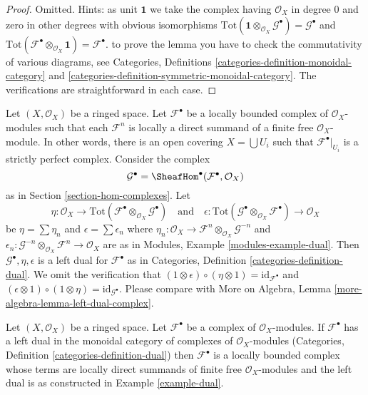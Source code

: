 \begin{proof}
Omitted. Hints: as unit $\mathbf{1}$ we take the complex having
$\mathcal{O}_X$ in degree $0$ and zero in other degrees with
obvious isomorphisms
$\text{Tot}(\mathbf{1} \otimes_{\mathcal{O}_X} \mathcal{G}^\bullet) =
\mathcal{G}^\bullet$ and
$\text{Tot}(\mathcal{F}^\bullet \otimes_{\mathcal{O}_X} \mathbf{1}) =
\mathcal{F}^\bullet$.
to prove the lemma you have to check the commutativity
of various diagrams, see Categories, Definitions
\ref{categories-definition-monoidal-category} and
\ref{categories-definition-symmetric-monoidal-category}.
The verifications are straightforward in each case.
\end{proof}

\begin{example}
\label{example-dual}
Let $(X, \mathcal{O}_X)$ be a ringed space. Let $\mathcal{F}^\bullet$
be a locally bounded complex of $\mathcal{O}_X$-modules such that each
$\mathcal{F}^n$ is locally a direct summand of a finite
free $\mathcal{O}_X$-module. In other words, there is an open covering
$X = \bigcup U_i$ such that $\mathcal{F}^\bullet|_{U_i}$ is a strictly
perfect complex. Consider the complex
$$
\mathcal{G}^\bullet = \SheafHom^\bullet(\mathcal{F}^\bullet, \mathcal{O}_X)
$$
as in Section \ref{section-hom-complexes}. Let
$$
\eta :
\mathcal{O}_X
\to
\text{Tot}(\mathcal{F}^\bullet \otimes_{\mathcal{O}_X} \mathcal{G}^\bullet)
\quad\text{and}\quad
\epsilon :
\text{Tot}(\mathcal{G}^\bullet \otimes_{\mathcal{O}_X} \mathcal{F}^\bullet)
\to
\mathcal{O}_X
$$
be $\eta = \sum \eta_n$ and $\epsilon = \sum \epsilon_n$
where $\eta_n : \mathcal{O}_X \to
\mathcal{F}^n \otimes_{\mathcal{O}_X} \mathcal{G}^{-n}$
and
$\epsilon_n : \mathcal{G}^{-n} \otimes_{\mathcal{O}_X} \mathcal{F}^n
\to \mathcal{O}_X$ are as in Modules, Example \ref{modules-example-dual}.
Then $\mathcal{G}^\bullet, \eta, \epsilon$
is a left dual for $\mathcal{F}^\bullet$ as in
Categories, Definition \ref{categories-definition-dual}.
We omit the verification that
$(1 \otimes \epsilon) \circ (\eta \otimes 1) = \text{id}_{\mathcal{F}^\bullet}$
and
$(\epsilon \otimes 1) \circ (1 \otimes \eta) =
\text{id}_{\mathcal{G}^\bullet}$. Please compare with
More on Algebra, Lemma \ref{more-algebra-lemma-left-dual-complex}.
\end{example}

\begin{lemma}
\label{lemma-left-dual-complex}
Let $(X, \mathcal{O}_X)$ be a ringed space. Let $\mathcal{F}^\bullet$
be a complex of $\mathcal{O}_X$-modules. If $\mathcal{F}^\bullet$
has a left dual in the monoidal category of complexes of
$\mathcal{O}_X$-modules
(Categories, Definition \ref{categories-definition-dual})
then $\mathcal{F}^\bullet$ is a locally bounded complex whose terms are
locally direct summands of finite free $\mathcal{O}_X$-modules
and the left dual is as constructed in Example \ref{example-dual}.
\end{lemma}

